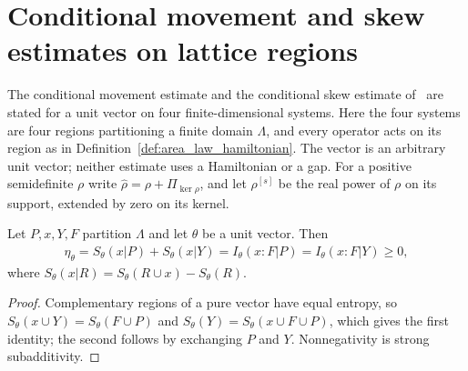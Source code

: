 \section{Conditional movement and skew estimates on lattice regions}
\label{sec:area_law_conditional_estimates}

The conditional movement estimate and the conditional skew estimate
of~\cite[Lemmas~5.1 and~5.3]{OpenAI2026AreaLaw} are stated for a unit vector
on four finite-dimensional systems. Here the four systems are four regions
partitioning a finite domain $\Lambda$, and every operator acts on its region
as in Definition~\ref{def:area_law_hamiltonian}. The vector is an arbitrary
unit vector; neither estimate uses a Hamiltonian or a gap. For a positive
semidefinite $\rho$ write $\hat\rho=\rho+\Pi_{\ker\rho}$, and let
$\rho^{[s]}$ be the real power of $\rho$ on its support, extended by zero on
its kernel.

\begin{lemma}
    \label{thm:area_law_movement_eta}
    \leanok
    Let $P,x,Y,F$ partition $\Lambda$ and let $\theta$ be a unit vector. Then
    \begin{align}
        \eta_\theta=S_\theta(x|P)+S_\theta(x|Y)=I_\theta(x:F|P)=I_\theta(x:F|Y)\ge0,
    \end{align}
    where $S_\theta(x|R)=S_\theta(R\cup x)-S_\theta(R)$.
\end{lemma}
\begin{proof}\leanok
    Complementary regions of a pure vector have equal entropy, so
    $S_\theta(x\cup Y)=S_\theta(F\cup P)$ and
    $S_\theta(Y)=S_\theta(x\cup F\cup P)$, which gives the first identity; the
    second follows by exchanging $P$ and $Y$. Nonnegativity is strong
    subadditivity.
\end{proof}

